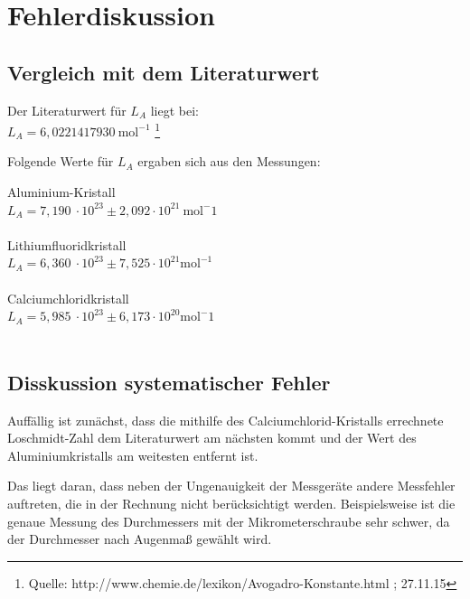 \documentclass[12pt,a4paper,titlepage,headinclude,bibtotoc]{scrartcl}
\begin{document}
\section{Fehlerdiskussion}

\subsection{Vergleich mit dem Literaturwert}


Der Literaturwert für $L_A$ liegt bei:\\


$  L_A = 6,0221417930 \ \mathrm{mol^{-1}} $ \footnote{Quelle: http://www.chemie.de/lexikon/Avogadro-Konstante.html ; 27.11.15}

\vspace{3mm}
Folgende Werte für $L_A$ ergaben sich aus den Messungen:\\
\vspace{2.5mm}

 Aluminium-Kristall\\
 \quad $ L_A= 7,190 \ \cdot 10^{23}  \pm 2,092\cdot10^{21} \ \mathrm{mol^-1} $\\
   \\
 Lithiumfluoridkristall\\
\quad $ L_A = 6,360 \ \cdot 10^{23} \pm 7,525 \cdot 10^{21} \mathrm{mol^{-1}} $\\
 \\
 Calciumchloridkristall\\
 \quad $L_A = 5,985 \ \cdot 10^{23} \pm 6,173 \cdot 10^{20} \mathrm{mol^-1}$\\
 \\
\newpage


\subsection{Disskussion systematischer Fehler}

Auffällig ist zunächst, dass die mithilfe des Calciumchlorid-Kristalls errechnete Loschmidt-Zahl dem Literaturwert am nächsten kommt und der Wert des Aluminiumkristalls am weitesten entfernt ist.

Das liegt daran, dass neben der Ungenauigkeit der Messgeräte andere Messfehler auftreten, die in der Rechnung nicht berücksichtigt werden. Beispielsweise ist die genaue Messung des Durchmessers mit der Mikrometerschraube sehr schwer, da der Durchmesser nach Augenmaß gewählt wird. \\
\end{document}
